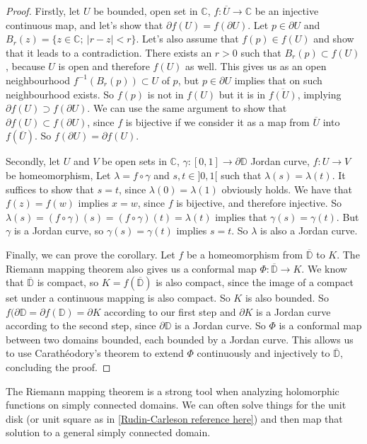 \documentclass[a4paper,12pt,twoside,BCOR=10mm]{scrbook}
\begin{document}
\begin{proof}
Firstly, let $U$ be bounded, open set in $\mathbb{C}$,
	$f: \overline{U} \rightarrow \mathbb{C}$ be an injective continuous map,
	and let's show that $\partial f(U) = f(\partial U)$.
Let $p \in \partial U$ and $B_r(z) = \{z \in \mathbb{C};\ |r - z| < r\}$.
Let's also assume that $f(p) \in f(U)$ and show that it leads to a contradiction.
There exists an $r > 0$ such that $B_r(p) \subset f(U)$, because $U$ is open and therefore $f(U)$ as well.
This gives us as an open neighbourhood $f^{-1}(B_r(p)) \subset U$ of $p$, but $p \in \partial U$ implies that on such neighbourhood exists.
So $f(p)$ is not in $f(U)$ but it is in $\overline{f(U)}$, implying $\partial f(U) \supset f(\partial U)$.
We can use the same argument to show that $\partial f(U) \subset f(\partial U)$, since $f$ is bijective if we consider it as a map from $\overline{U}$ into $f(\overline{U})$.
So $f(\partial U) = \partial f(U)$. %

Secondly, let
	$U$ and $V$ be open sets in $\mathbb{C}$,
	$\gamma: [0, 1] \rightarrow \partial \mathbb{D}$ Jordan curve,
	$f: U \rightarrow V$ be homeomorphism,
Let $\lambda = f \circ \gamma$ and $s, t \in ]0, 1[$ such that $\lambda(s) = \lambda(t)$.
It suffices to show that $s = t$, since $\lambda(0) = \lambda(1)$ obviously holds.
We have that $f(z) = f(w)$ implies $x = w$, since $f$ is bijective, and therefore injective.
So $\lambda(s) = (f \circ \gamma)(s) = (f \circ \gamma)(t) = \lambda(t)$ implies that $\gamma(s) = \gamma(t)$.
But $\gamma$ is a Jordan curve, so $\gamma(s) = \gamma(t)$ implies $s = t$.
So $\lambda$ is also a Jordan curve. %

Finally, we can prove the corollary.
Let $f$ be a homeomorphism from $\overline{\mathbb{D}}$ to $K$.
The Riemann mapping theorem also gives us a conformal map $\Phi: \overline{\mathbb{D}} \rightarrow K$.
We know that $\overline{\mathbb{D}}$ is compact, so $K = f(\overline{\mathbb{D}})$ is also compact, since the image of a compact set under a continuous mapping is also compact.
So $K$ is also bounded.
So $f(\partial \mathbb{D} = \partial f(\mathbb{D}) = \partial K$ according to our first step and $\partial K$ is a Jordan curve according to the second step, since $\partial \mathbb{D}$ is a Jordan curve.
So $\Phi$ is a conformal map between two domains bounded, each bounded by a Jordan curve.
This allows us to use Carathéodory's theorem to extend $\Phi$ continuously and injectively to $\overline{\mathbb{D}}$, concluding the proof.
\end{proof}
The Riemann mapping theorem is a strong tool when analyzing holomorphic functions on simply connected domains.
We can often solve things for the unit disk (or unit square as in \ref{Rudin-Carleson reference here}) and then map that solution to a general simply connected domain. %
\end{document}
